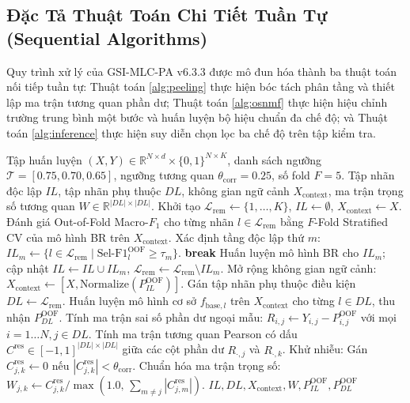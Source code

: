\documentclass[10pt,a4paper,twoside]{article}
\begin{document}
\subsection{Đặc Tả Thuật Toán Chi Tiết Tuần Tự (Sequential Algorithms)}
Quy trình xử lý của GSI-MLC-PA v6.3.3 được mô đun hóa thành ba thuật toán nối tiếp tuần tự: Thuật toán \ref{alg:peeling} thực hiện bóc tách phân tầng và thiết lập ma trận tương quan phần dư; Thuật toán \ref{alg:osnmf} thực hiện hiệu chỉnh trường trung bình một bước và huấn luyện bộ hiệu chuẩn đa chế độ; và Thuật toán \ref{alg:inference} thực hiện suy diễn chọn lọc ba chế độ trên tập kiểm tra.

\begin{algorithm}[H]
\caption{Giai Đoạn 1: Bóc Tách Phân Tầng \& Thiết Lập Đồ Thị Phần Dư Sai Số}
\label{alg:peeling}
\begin{algorithmic}[1]
\Require Tập huấn luyện $(X, Y) \in \mathbb{R}^{N \times d} \times \{0, 1\}^{N \times K}$, danh sách ngưỡng $\mathcal{T} = [0.75, 0.70, 0.65]$, ngưỡng tương quan $\theta_{\text{corr}} = 0.25$, số fold $F=5$.
\Ensure Tập nhãn độc lập $IL$, tập nhãn phụ thuộc $DL$, không gian ngữ cảnh $X_{\text{context}}$, ma trận trọng số tương quan $W \in \mathbb{R}^{|DL| \times |DL|}$.
\State Khởi tạo $\mathcal{L}_{\text{rem}} \gets \{1, \dots, K\}$, $IL \gets \emptyset$, $X_{\text{context}} \gets X$.
    \State Đánh giá Out-of-Fold Macro-$F_1$ cho từng nhãn $l \in \mathcal{L}_{\text{rem}}$ bằng $F$-Fold Stratified CV của mô hình BR trên $X_{\text{context}}$.
    \State Xác định tầng độc lập thứ $m$: $IL_m \gets \{l \in \mathcal{L}_{\text{rem}} \mid \text{Sel-F1}_l^{\text{OOF}} \ge \tau_m\}$.
     \State \textbf{break} \EndIf
    \State Huấn luyện mô hình BR cho $IL_m$; cập nhật $IL \gets IL \cup IL_m$, $\mathcal{L}_{\text{rem}} \gets \mathcal{L}_{\text{rem}} \setminus IL_m$.
    \State Mở rộng không gian ngữ cảnh: $X_{\text{context}} \gets [X, \text{Normalize}(P^{\text{OOF}}_{IL})]$.
\EndFor
\State Gán tập nhãn phụ thuộc điều kiện $DL \gets \mathcal{L}_{\text{rem}}$.
\State Huấn luyện mô hình cơ sở $f_{\text{base}, l}$ trên $X_{\text{context}}$ cho từng $l \in DL$, thu nhận $P^{\text{OOF}}_{DL}$.
\State Tính ma trận sai số phần dư ngoại mẫu: $R_{i, j} \gets Y_{i, j} - P^{\text{OOF}}_{i, j}$ với mọi $i=1 \dots N, j \in DL$.
\State Tính ma trận tương quan Pearson có dấu $C^{\text{res}} \in [-1, 1]^{|DL| \times |DL|}$ giữa các cột phần dư $R_{\cdot, j}$ và $R_{\cdot, k}$.
\State Khử nhiễu: Gán $C^{\text{res}}_{j, k} \gets 0$ nếu $|C^{\text{res}}_{j, k}| < \theta_{\text{corr}}$.
\State Chuẩn hóa ma trận trọng số: $W_{j, k} \gets C^{\text{res}}_{j, k} / \max\left(1.0, \, \sum_{m \neq j} |C^{\text{res}}_{j, m}|\right)$.
\State \Return $IL, DL, X_{\text{context}}, W, P^{\text{OOF}}_{IL}, P^{\text{OOF}}_{DL}$
\end{algorithmic}
\end{algorithm}
\end{document}
